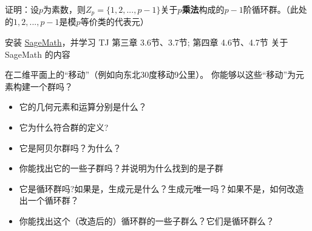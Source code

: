 \documentclass[a4paper, justified]{tufte-handout}
\begin{document}
\beginoptional

\begin{problem}[$Z_p$]
证明：设$p$为素数，则$Z_p=\{1,2,...,p-1\}$关于$p$\textbf{乘法}构成的$p-1$阶循环群。（此处的$1,2,...,p-1$是模$p$等价类的代表元）
\end{problem}

\begin{solution}
\end{solution}

\begin{problem}[SageMath学习]
安装 \href{https://www.sagemath.org/}{SageMath}，并学习 TJ 第三章 3.6节、3.7节; 第四章 4.6节、4.7节 关于 SageMath 的内容
\end{problem}

\begin{solution}
\end{solution}

\beginot

在二维平面上的``移动''（例如向东北30度移动9公里）。
你能够以这些``移动''为元素构建一个群吗？
\begin{ot}[``移动''群-1]
	\begin{itemize}
		\item 它的几何元素和运算分别是什么？
		\item 它为什么符合群的定义?
		\item 它是阿贝尔群吗？为什么？
	\end{itemize}
\end{ot}


\begin{ot}[``移动''群-2]
	\begin{itemize}
		\item 你能找出它的一些子群吗？并说明为什么找到的是子群
		\item 它是循环群吗?如果是，生成元是什么？生成元唯一吗？如果不是，如何改造出一个循环群？
		\item 你能找出这个（改造后的）循环群的一些子群么？它们是循环群么？
	\end{itemize}
\end{ot}


\end{document}
